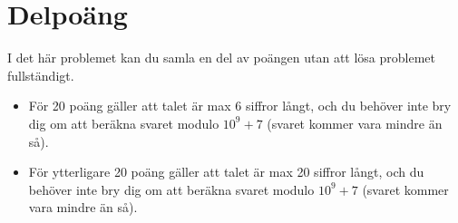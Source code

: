 \section*{Delpoäng}
I det här problemet kan du samla en del av poängen utan att lösa problemet fullständigt.

\begin{itemize}
    \item För 20 poäng gäller att talet är max 6 siffror långt, och du behöver inte bry dig om att beräkna svaret modulo $10^9 + 7$ (svaret kommer vara mindre än så).
    \item För ytterligare 20 poäng gäller att talet är max 20 siffror långt, och du behöver inte bry dig om att beräkna svaret modulo $10^9 + 7$ (svaret kommer vara mindre än så).
\end{itemize}
